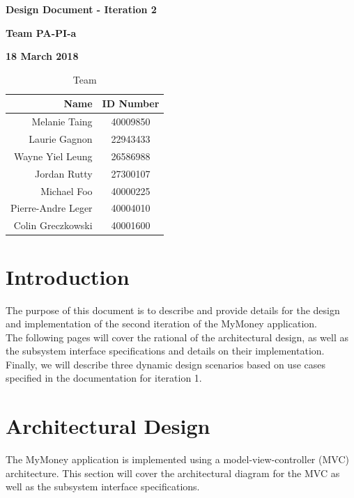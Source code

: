 \documentclass[12pt]{article}
\begin{document}
\newcommand{\code}[1]{\colorbox{light-gray}{\texttt{#1}}}

\vspace*{0.5in}
\centerline{\bf\Large Design Document - Iteration 2}

\vspace*{0.5in}
\centerline{\bf\Large Team PA-PI-a}

\vspace*{0.5in}
\centerline{\bf\Large 18 March 2018}

\vspace*{1.5in}
\begin{table}[htbp]
\caption{Team}
\begin{center}
\begin{tabular}{|r | c|}
\hline
Name & ID Number \\
\hline\hline
Melanie Taing & 40009850 \\
Laurie Gagnon & 22943433 \\
Wayne Yiel Leung & 26586988 \\
Jordan Rutty & 27300107 \\
Michael Foo & 40000225 \\
Pierre-Andre Leger & 40004010 \\
Colin Greczkowski & 40001600 \\
\hline
\end{tabular}
\end{center}
\end{table}

\clearpage

\tableofcontents
\clearpage

\listoffigures
\clearpage

\section{Introduction}
The purpose of this document is to describe and provide details for the design and
implementation of the second iteration of the MyMoney application.\\

The following pages will cover the rational of the architectural design, as well as the
subsystem interface specifications and details on their implementation. Finally, we will
describe three dynamic design scenarios based on use cases specified in the documentation
for iteration 1.

\section{Architectural Design} \label{sec:arch}
The MyMoney application is implemented using a model-view-controller (MVC) architecture. This section will cover the architectural diagram for the MVC as well as the subsystem interface specifications.
\newpage
\end{document}
